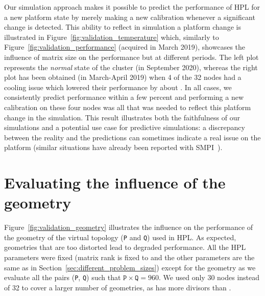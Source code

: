         Our simulation approach makes it possible to predict the performance of HPL for a new platform state by merely
        making a new calibration whenever a significant change is detected.  This ability to reflect in simulation a
        platform change is illustrated in Figure~\ref{fig:validation_temperature} which, similarly to
        Figure~\ref{fig:validation_performance} (acquired in March 2019), showcases the influence of matrix size on the
        performance but at different periods.  The left plot represents the \emph{normal} state of the cluster (in
        September 2020), whereas the right plot has been obtained (in March-April 2019) when 4 of the 32 nodes had a
        cooling issue which lowered their performance by about . In all cases, we consistently predict
        performance within a few percent and performing a new \dgemm calibration on these four nodes was all
        that was needed to reflect this platform change in the simulation.
        This result illustrates both the faithfulness of our simulations and a potential use case for predictive
        simulations: a discrepancy between the reality and the predictions can sometimes indicate a real issue on the
        platform (similar situations have already been reported with SMPI~\cite{smpi}).

    \section{Evaluating the influence of the geometry}%
    \label{sec:different_geometries}
        Figure~\ref{fig:validation_geometry} illustrates the influence on the performance of the geometry of the virtual
        topology (\texttt{P} and \texttt{Q}) used in HPL\@.  As expected, geometries that are too distorted lead to
        degraded performance.  All the HPL parameters were fixed (matrix rank is fixed to  and the other
        parameters are the same as in Section~\ref{sec:different_problem_sizes}) except for the geometry as we evaluate
        all the pairs (\texttt{P}, \texttt{Q}) such that \(\texttt{P}\times\texttt{Q}=960\).  We used only 30 nodes
        instead of 32 to cover a larger number of geometries, as  has more divisors than .

